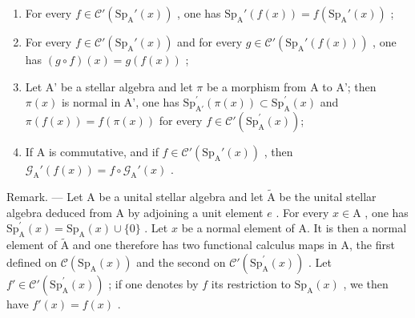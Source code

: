 \begin{enumerate}
\def\labelenumi{\alph{enumi})}
\item
  For every \(f \in \mathcal{C}'(\mathrm{Sp}_{\mathrm{A}}'(x))\) , one has \(\mathrm{Sp}_{\mathrm{A}}'(f(x)) = f(\mathrm{Sp}_{\mathrm{A}}'(x))\) ;
\item
  For every \(f \in \mathcal{C}'(\mathrm{Sp}_{\mathrm{A}}'(x))\) and for every \(g \in \mathcal{C}'(\mathrm{Sp}_{\mathrm{A}}'(f(x)))\) , one has \((g \circ f)(x) = g(f(x))\) ;
\item
  Let A' be a stellar algebra and let \(\pi\) be a morphism from A to A'; then \(\pi(x)\) is normal in A', one has \(\mathrm{Sp}_{\mathrm{A}'}^{\prime}(\pi(x)) \subset \mathrm{Sp}_{\mathrm{A}}^{\prime}(x)\) and \(\pi(f(x)) = f(\pi(x))\) for every \(f \in \mathcal{C}'(\mathrm{Sp}_{\mathrm{A}}^{\prime}(x))\);
\item
  If A is commutative, and if \(f \in \mathcal{C}'(\mathrm{Sp}_{\mathrm{A}}'(x))\) , then \(\mathcal{G}_{\mathrm{A}}'(f(x)) = f \circ \mathcal{G}_{\mathrm{A}}'(x)\) .
\end{enumerate}

Remark. --- Let A be a unital stellar algebra and let \(\widetilde{\mathrm{A}}\) be the unital stellar algebra deduced from A by adjoining a unit element \(e\) . For every \(x \in \mathrm{A}\) , one has \(\mathrm{Sp}_{\mathrm{A}}^{\prime}(x) = \mathrm{Sp}_{\mathrm{A}}(x) \cup \{0\}\) . Let \(x\) be a normal element of A. It is then a normal element of \(\widetilde{\mathrm{A}}\) and one therefore has two functional calculus maps in A, the first defined on \(\mathcal{C}(\mathrm{Sp}_{\mathrm{A}}(x))\) and the second on \(\mathcal{C}'(\mathrm{Sp}_{\mathrm{A}}^{\prime}(x))\) . Let \(f' \in \mathcal{C}'(\mathrm{Sp}_{\mathrm{A}}^{\prime}(x))\) ; if one denotes by \(f\) its restriction to \(\mathrm{Sp}_{\mathrm{A}}(x)\) , we then have \(f'(x) = f(x)\) .


